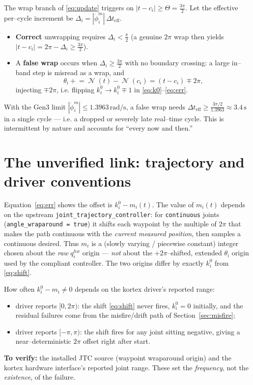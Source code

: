 \documentclass[11pt]{article}
\DeclareMathOperator{\Nrm}{\mathcal{N}}
\begin{document}
The wrap branch of \eqref{eq:update} triggers on $|t-c_i|\ge\Theta=\tfrac{3\pi}{2}$.
Let the effective per--cycle increment be
$\Delta_i=|\dot\phi^m_i|\,\Delta t_{\mathrm{eff}}$.
\begin{itemize}
  \item \textbf{Correct} unwrapping requires $\Delta_i<\tfrac{\pi}{2}$
        (a genuine $2\pi$ wrap then yields $|t-c_i|=2\pi-\Delta_i\ge\tfrac{3\pi}{2}$).
  \item A \textbf{false wrap} occurs when $\Delta_i\ge\tfrac{3\pi}{2}$ with no
        boundary crossing: a large in--band step is misread as a wrap, and
        \begin{equation}
        \theta_i\mathrel{+}=\Nrm(t)-\Nrm(c_i)=(t-c_i)\mp 2\pi,
        \end{equation}
        injecting $\mp2\pi$, i.e. flipping $k_i^0\to k_i^0\mp1$ in
        \eqref{eq:k0}--\eqref{eq:err}.
\end{itemize}
With the Gen3 limit $|\dot\phi^m_i|\le 1.3963\,\mathrm{rad/s}$, a false wrap
needs $\Delta t_{\mathrm{eff}}\ge\frac{3\pi/2}{1.3963}\approx 3.4\,\mathrm{s}$ in a
single cycle --- i.e. a dropped or severely late real--time cycle. This is
intermittent by nature and accounts for ``every now and then.''

\section{The unverified link: trajectory and driver conventions}
\label{sec:jtc}

Equation~\eqref{eq:err} shows the offset is $k_i^0-m_i(t)$. The value of
$m_i(t)$ depends on the upstream
\texttt{joint\_trajectory\_controller}: for \texttt{continuous} joints
(\texttt{angle\_wraparound = true}) it shifts each waypoint by the multiple
of $2\pi$ that makes the path continuous with the \emph{current measured
position}, then samples a continuous desired. Thus $m_i$ is a (slowly
varying / piecewise constant) integer chosen about the \emph{raw}
$q^{hw}_i$ origin --- \emph{not} about the $+2\pi$--shifted, extended
$\theta_i$ origin used by the compliant controller. The two origins differ
by exactly $k_i^0$ from \eqref{eq:shift}.

How often $k_i^0-m_i\neq 0$ depends on the kortex driver's reported range:
\begin{itemize}
  \item driver reports $[0,2\pi)$: the shift \eqref{eq:shift} never fires,
        $k_i^0=0$ initially, and the residual failures come from the
        misfire/drift path of Section~\ref{sec:misfire};
  \item driver reports $[-\pi,\pi)$: the shift fires for any joint sitting
        negative, giving a near--deterministic $2\pi$ offset right after start.
\end{itemize}
\textbf{To verify:} the installed JTC source (waypoint wraparound origin)
and the kortex hardware interface's reported joint range. These set the
\emph{frequency}, not the \emph{existence}, of the failure.
\end{document}

